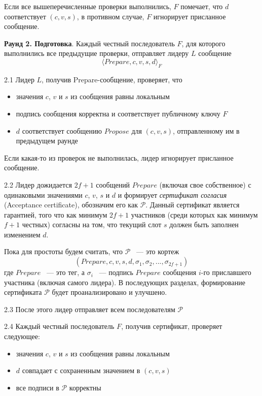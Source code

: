 Если все вышеперечисленные проверки выполнились, $F$ помечает, что $d$ соответствует $(c, v, s)$, в противном случае, $F$ игнорирует присланное сообщение. 
\vspace{10pt}

\textbf{Раунд 2. Подготовка}. Каждый честный последователь $F$, для которого выполнились все предыдущие проверки, отправляет лидеру $L$ сообщение 
\[ \langle Prepare, c, v, s, d \rangle_F \]

2.1 Лидер $L$, получив Prepare-сообщение, проверяет, что
\begin{itemize}
\item значения $c$, $v$ и $s$ из сообщения равны локальным
\item подпись сообщения корректна и соответствует публичному ключу $F$
\item $d$ соответствует сообщению $Propose$ для $(c, v, s)$, отправленному им в предыдущем раунде
\end{itemize}
Если какая-то из проверок не выполнилась, лидер игнорирует присланное сообщение. 

2.2 Лидер дожидается $2f+1$ сообщений $Prepare$ (включая свое собственное) с одинаковыми значениями $c$, $v$, $s$ и $d$ и формирует \textit{сертификат согласия} (Acceptance certificate), обозначим его как $\mathcal{P}$. Данный сертификат является гарантией, того что как минимум $2f+1$ участников (среди которых как минимум $f+1$ честных) согласны на том, что текущий слот $s$ должен быть заполнен изменением $d$.

Пока для простоты будем считать, что $\mathcal{P}$ ~--- это кортеж
$$(Prepare, c, v, s, d, \sigma_1, \sigma_2, ..., \sigma_{2f+1})$$
где $Prepare$ ~--- это тег, а $\sigma_i$ ~--- подпись $Prepare$ сообщения $i$-го приславшего участника (включая самого лидера). 
В последующих разделах, формирование сертификата $\mathcal{P}$ будет проанализировано и улучшено.

2.3 После этого лидер отправляет всем последователям  $\mathcal{P}$

2.4 Каждый честный последователь $F$, получив сертификат, проверяет следующее:
\begin{itemize}
\item значения $c$, $v$ и $s$ из сообщения равны локальным
\item $d$ совпадает с сохраненным значением в $(c, v, s)$
\item все подписи в $\mathcal{P}$ корректны
\end{itemize}
\vspace{10pt}

